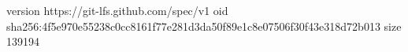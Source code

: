 version https://git-lfs.github.com/spec/v1
oid sha256:4f5e970e55238c0cc8161f77e281d3da50f89e1c8e07506f30f43e318d72b013
size 139194
